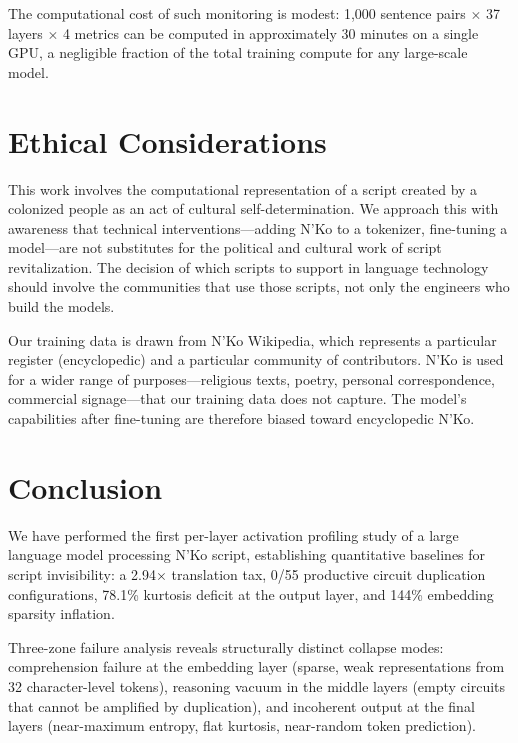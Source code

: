 \documentclass[11pt]{article}
\begin{document}
The computational cost of such monitoring is modest: 1,000 sentence pairs $\times$ 37 layers $\times$ 4 metrics can be computed in approximately 30 minutes on a single GPU, a negligible fraction of the total training compute for any large-scale model.

\section{Ethical Considerations}

This work involves the computational representation of a script created by a colonized people as an act of cultural self-determination.
We approach this with awareness that technical interventions---adding N'Ko to a tokenizer, fine-tuning a model---are not substitutes for the political and cultural work of script revitalization.
The decision of which scripts to support in language technology should involve the communities that use those scripts, not only the engineers who build the models.

Our training data is drawn from N'Ko Wikipedia, which represents a particular register (encyclopedic) and a particular community of contributors.
N'Ko is used for a wider range of purposes---religious texts, poetry, personal correspondence, commercial signage---that our training data does not capture.
The model's capabilities after fine-tuning are therefore biased toward encyclopedic N'Ko.

\section{Conclusion}

We have performed the first per-layer activation profiling study of a large language model processing N'Ko script, establishing quantitative baselines for script invisibility: a 2.94$\times$ translation tax, 0/55 productive circuit duplication configurations, 78.1\% kurtosis deficit at the output layer, and 144\% embedding sparsity inflation.

Three-zone failure analysis reveals structurally distinct collapse modes: comprehension failure at the embedding layer (sparse, weak representations from 32 character-level tokens), reasoning vacuum in the middle layers (empty circuits that cannot be amplified by duplication), and incoherent output at the final layers (near-maximum entropy, flat kurtosis, near-random token prediction).
\end{document}
